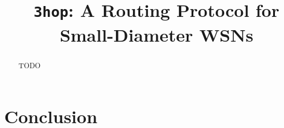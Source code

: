 \documentclass[conference]{IEEEtran}
\begin{document}
\title{\texttt{3hop}: A Routing Protocol for Small-Diameter WSNs}

\author{
\and
{}
}

\maketitle

\begin{abstract}
TODO
\end{abstract}













\section{Conclusion}



\end{document}
